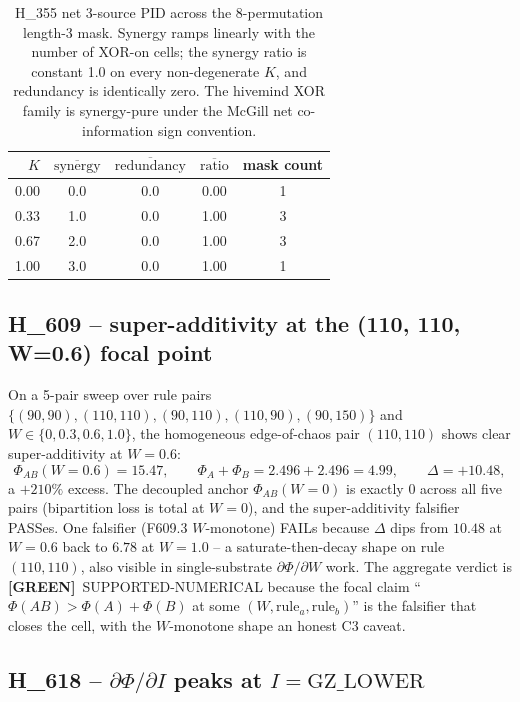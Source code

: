 \documentclass[11pt,a4paper]{article}
\providecommand{\tierGreen}{\textbf{[GREEN]}}
\begin{document}
\begin{table}[h]
\centering
\small
\begin{tabular}{rcccc}
\toprule
\textbf{$K$} & \textbf{$\overline{\text{synergy}}$} &
\textbf{$\overline{\text{redundancy}}$} &
\textbf{$\overline{\text{ratio}}$} & \textbf{mask count} \\
\midrule
0.00 & 0.0 & 0.0 & 0.00 & 1 \\
0.33 & 1.0 & 0.0 & 1.00 & 3 \\
0.67 & 2.0 & 0.0 & 1.00 & 3 \\
1.00 & 3.0 & 0.0 & 1.00 & 1 \\
\bottomrule
\end{tabular}
\caption{H\_355 net 3-source PID across the 8-permutation length-3
mask. Synergy ramps linearly with the number of XOR-on cells; the
synergy ratio is constant 1.0 on every non-degenerate $K$, and
redundancy is identically zero. The hivemind XOR family is
synergy-pure under the McGill net co-information sign convention.}
\label{tab:h355}
\end{table}

\subsection{H\_609 -- super-additivity at the (110, 110, W=0.6) focal point}

On a 5-pair sweep over rule pairs $\{(90,90), (110,110), (90,110),
(110,90), (90,150)\}$ and $W \in \{0, 0.3, 0.6, 1.0\}$, the
homogeneous edge-of-chaos pair $(110,110)$ shows clear
super-additivity at $W=0.6$:
\[
  \Phi_{AB}(W=0.6) = 15.47, \qquad
  \Phi_A + \Phi_B = 2.496 + 2.496 = 4.99, \qquad
  \Delta = +10.48,
\]
a $+210\%$ excess. The decoupled anchor $\Phi_{AB}(W=0)$ is exactly $0$
across all five pairs (bipartition loss is total at $W=0$), and the
super-additivity falsifier PASSes. One falsifier (F609.3 $W$-monotone)
FAILs because $\Delta$ dips from $10.48$ at $W=0.6$ back to $6.78$ at
$W=1.0$ -- a saturate-then-decay shape on rule $(110, 110)$, also
visible in single-substrate $\partial\Phi/\partial W$ work. The aggregate
verdict is \tierGreen\ SUPPORTED-NUMERICAL because the focal claim
``$\Phi(AB) > \Phi(A) + \Phi(B)$ at some $(W, \mathrm{rule}_a, \mathrm{rule}_b)$''
is the falsifier that closes the cell, with the $W$-monotone shape an
honest C3 caveat.

\subsection{H\_618 -- $\partial\Phi/\partial I$ peaks at $I = \mathrm{GZ\_LOWER}$}
\end{document}

